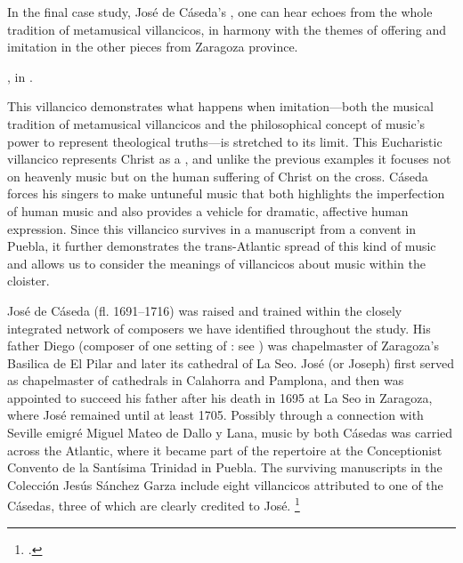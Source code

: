 In the final case study, José de Cáseda's , one can
hear echoes from the whole tradition of metamusical villancicos, in harmony
with the themes of offering and imitation in the other pieces from Zaragoza
province.%
\begin{Footnote} 
    , in \autocite[41--42, 153--192]{Cashner:WLSCM32}.
\end{Footnote}
This villancico demonstrates what happens when imitation---both the musical
tradition of metamusical villancicos and the philosophical concept of music's
power to represent theological truths---is stretched to its limit.
This Eucharistic villancico represents Christ as a , and unlike
the previous examples it focuses not on heavenly music but on the human
suffering of Christ on the cross.
Cáseda forces his singers to make untuneful music that both highlights the
imperfection of human music and also provides a vehicle for dramatic, affective
human expression. 
Since this villancico survives in a manuscript from a convent in Puebla, it
further demonstrates the trans-Atlantic spread of this kind of music and allows
us to consider the meanings of villancicos about music within the cloister.


José de Cáseda (fl. 1691--1716) was raised and trained within the closely
integrated network of composers we have identified throughout the study.%
    \Autocites
    [120--121]{Calahorra:Zaragoza2}
    {Stevenson:CasedaD}
His father Diego (composer of one setting of : see
) was chapelmaster of Zaragoza's Basilica de El
Pilar and later its cathedral of La Seo.
José (or Joseph) first served as chapelmaster of cathedrals in Calahorra and
Pamplona, and then was appointed to succeed his father after his death in 1695
at La Seo in Zaragoza, where José remained until at least 1705.
Possibly through a connection with Seville emigré Miguel Mateo de Dallo y Lana,
music by both Cásedas was carried across the Atlantic, where it became part of
the repertoire at the Conceptionist Convento de la Santísima Trinidad in
Puebla.
The surviving manuscripts in the Colección Jesús Sánchez Garza include eight
villancicos attributed to one of the Cásedas, three of which are clearly
credited to José.%
    \footnote{.}

